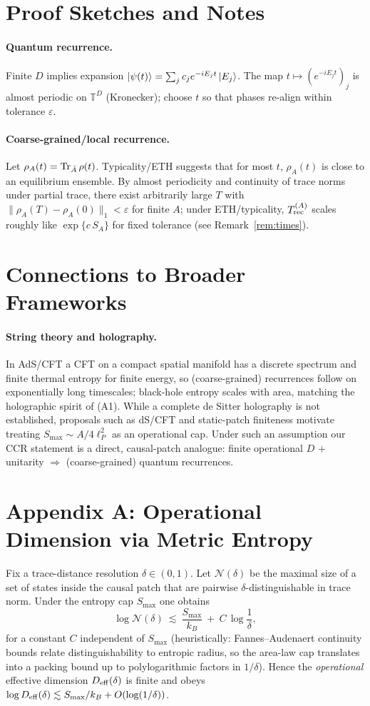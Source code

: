 \documentclass[12pt]{article}
\newcommand{\Smax}{S_{\max}}
\theoremstyle{remark}
\begin{document}
\section{Proof Sketches and Notes}
\paragraph{Quantum recurrence.} Finite $D$ implies expansion $|\psi(t)\rangle=\sum_j c_j e^{-iE_j t}\ket{E_j}$. The map $t\mapsto (e^{-iE_j t})_j$ is almost periodic on $\mathbb{T}^D$ (Kronecker); choose $t$ so that phases re-align within tolerance $\varepsilon$.
\paragraph{Coarse-grained/local recurrence.} Let $\rho_A(t)=\Tr_{\bar A}\rho(t)$. Typicality/ETH suggests that for most $t$, $\rho_A(t)$ is close to an equilibrium ensemble. By almost periodicity and continuity of trace norms under partial trace, there exist arbitrarily large $T$ with $\|\rho_A(T)-\rho_A(0)\|_1<\varepsilon$ for finite $A$; under ETH/typicality, $T^{(A)}_{\rm rec}$ scales roughly like $\exp\{c\,S_A\}$ for fixed tolerance (see Remark~\ref{rem:times}).

\section{Connections to Broader Frameworks}

\paragraph{String theory and holography.}
In AdS/CFT a CFT on a compact spatial manifold has a discrete spectrum and finite thermal entropy for finite energy, so (coarse-grained) recurrences follow on exponentially long timescales; black-hole entropy scales with area, matching the holographic spirit of (A1). While a complete de Sitter holography is not established, proposals such as dS/CFT and static-patch finiteness motivate treating $\Smax\!\sim\! A/4\ell_P^2$ as an operational cap. Under such an assumption our CCR statement is a direct, causal-patch analogue: finite operational $D$ $+$ unitarity $\Rightarrow$ (coarse-grained) quantum recurrences.

\appendix
\section*{Appendix A: Operational Dimension via Metric Entropy}
Fix a trace-distance resolution $\delta\in(0,1)$. Let $\mathcal{N}(\delta)$ be the maximal size of a set of states inside the causal patch that are pairwise $\delta$-distinguishable in trace norm. Under the entropy cap $\Smax$ one obtains
\[
\log \mathcal{N}(\delta)\ \lesssim\ \frac{\Smax}{k_B}\ +\ C\,\log\!\frac{1}{\delta},
\]
for a constant $C$ independent of $\Smax$ (heuristically: Fannes--Audenaert continuity bounds relate distinguishability to entropic radius, so the area-law cap translates into a packing bound up to polylogarithmic factors in $1/\delta$). Hence the \emph{operational} effective dimension $D_{\rm eff}(\delta)$ is finite and obeys $\log D_{\rm eff}(\delta)\lesssim \Smax/k_B+O(\log(1/\delta))$.
\end{document}

